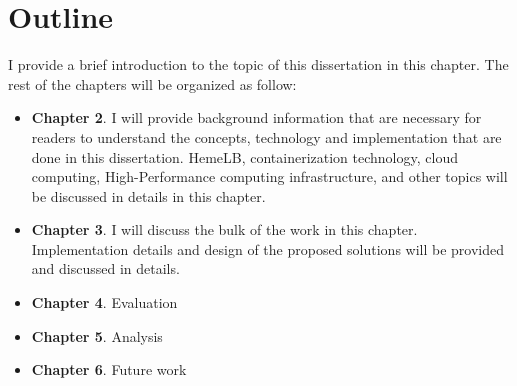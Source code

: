 \section{Outline}
I provide a brief introduction to the topic of this dissertation in this chapter. The rest of the chapters will be organized as follow:
\begin{itemize}
    \item \textbf{Chapter 2}. I will provide background information that are necessary for readers to understand the concepts, technology and implementation that are done in this dissertation. HemeLB, containerization technology, cloud computing, High-Performance computing infrastructure, and other topics will be discussed in details in this chapter.
    \item \textbf{Chapter 3}. I will discuss the bulk of the work in this chapter. Implementation details and design of the proposed solutions will be provided and discussed in details.
    \item \textbf{Chapter 4}. Evaluation
    \item \textbf{Chapter 5}. Analysis
    \item \textbf{Chapter 6}. Future work
\end{itemize}
